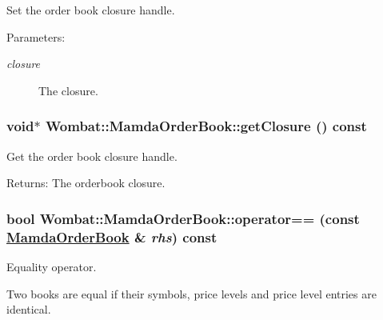 Set the order book closure handle. 

\begin{Desc}
\item[Parameters:]
\begin{description}
\item[{\em closure}]The closure. \end{description}
\end{Desc}
\hypertarget{classWombat_1_1MamdaOrderBook_a5600a658974539eaee3a0ea08da96c3}{
\subsubsection[getClosure]{\setlength{\rightskip}{0pt plus 5cm}void$\ast$ Wombat::Mamda\-Order\-Book::get\-Closure () const}}
\label{classWombat_1_1MamdaOrderBook_a5600a658974539eaee3a0ea08da96c3}


Get the order book closure handle. 

\begin{Desc}
\item[Returns:]The orderbook closure. \end{Desc}
\hypertarget{classWombat_1_1MamdaOrderBook_6b2b646dd6a77af9983fbe92ca12ec04}{
\subsubsection[operator==]{\setlength{\rightskip}{0pt plus 5cm}bool Wombat::Mamda\-Order\-Book::operator== (const \hyperlink{classWombat_1_1MamdaOrderBook}{Mamda\-Order\-Book} \& {\em rhs}) const}}
\label{classWombat_1_1MamdaOrderBook_6b2b646dd6a77af9983fbe92ca12ec04}


Equality operator. 

Two books are equal if their symbols, price levels and price level entries are identical.

